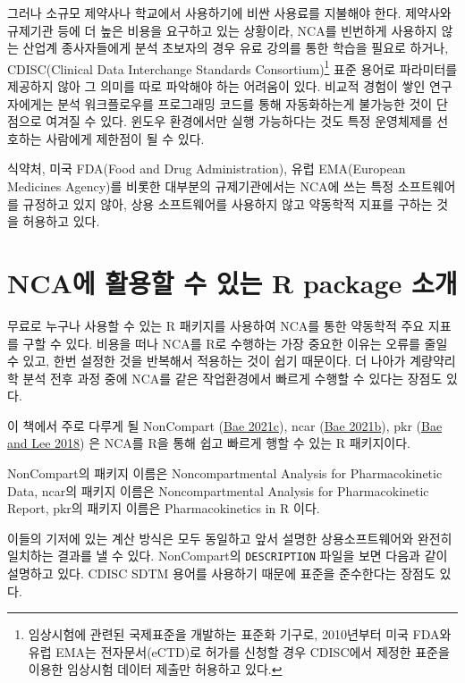 \documentclass[
  11pt,
  krantz2, a4paper, twoside]{krantz}
\theoremstyle{definition}
\theoremstyle{definition}
\theoremstyle{definition}
\theoremstyle{definition}
\theoremstyle{remark}
\begin{document}
그러나 소규모 제약사나 학교에서 사용하기에 비싼 사용료를 지불해야 한다.
제약사와 규제기관 등에 더 높은 비용을 요구하고 있는 상황이라, NCA를 빈번하게 사용하지 않는 산업계 종사자들에게
분석 초보자의 경우 유료 강의를 통한 학습을 필요로 하거나, CDISC(Clinical Data Interchange Standards Consortium)\footnote{임상시험에 관련된 국제표준을 개발하는 표준화 기구로, 2010년부터 미국 FDA와 유럽 EMA는 전자문서(eCTD)로 허가를 신청할 경우 CDISC에서 제정한 표준을 이용한 임상시험 데이터 제출만 허용하고 있다.} 표준 용어로 파라미터를 제공하지 않아 그 의미를 따로 파악해야 하는 어려움이 있다. 비교적 경험이 쌓인 연구자에게는 분석 워크플로우를 프로그래밍 코드를 통해 자동화하는게 불가능한 것이 단점으로 여겨질 수 있다. 윈도우 환경에서만 실행 가능하다는 것도 특정 운영체제를 선호하는 사람에게 제한점이 될 수 있다.

식약처, 미국 FDA(Food and Drug Administration), 유럽 EMA(European Medicines Agency)를 비롯한 대부분의 규제기관에서는 NCA에 쓰는 특정 소프트웨어를 규정하고 있지 않아, 상용 소프트웨어를 사용하지 않고 약동학적 지표를 구하는 것을 허용하고 있다.

\hypertarget{ncauxc5d0-uxd65cuxc6a9uxd560-uxc218-uxc788uxb294-r-package-uxc18cuxac1c}{%
\section{NCA에 활용할 수 있는 R package 소개}\label{ncauxc5d0-uxd65cuxc6a9uxd560-uxc218-uxc788uxb294-r-package-uxc18cuxac1c}}

무료로 누구나 사용할 수 있는 R 패키지를 사용하여 NCA를 통한 약동학적 주요 지표를 구할 수 있다. 비용을 떠나 NCA를 R로 수행하는 가장 중요한 이유는 오류를 줄일 수 있고, 한번 설정한 것을 반복해서 적용하는 것이 쉽기 때문이다. 더 나아가 계량약리학 분석 전후 과정 중에 NCA를 같은 작업환경에서 빠르게 수행할 수 있다는 장점도 있다.

이 책에서 주로 다루게 될 NonCompart (\protect\hyperlink{ref-R-NonCompart}{Bae 2021c}), ncar (\protect\hyperlink{ref-R-ncar}{Bae 2021b}), pkr (\protect\hyperlink{ref-R-pkr}{Bae and Lee 2018}) 은 NCA를 R을 통해 쉽고 빠르게 행할 수 있는 R 패키지이다.

NonCompart의 패키지 이름은 Noncompartmental Analysis for Pharmacokinetic Data,
ncar의 패키지 이름은 Noncompartmental Analysis for Pharmacokinetic Report,
pkr의 패키지 이름은 Pharmacokinetics in R 이다.

이들의 기저에 있는 계산 방식은 모두 동일하고 앞서 설명한 상용소프트웨어와 완전히 일치하는 결과를 낼 수 있다. NonCompart의 \texttt{DESCRIPTION} 파일을 보면 다음과 같이 설명하고 있다. CDISC SDTM 용어를 사용하기 때문에 표준을 준수한다는 장점도 있다.
\end{document}
